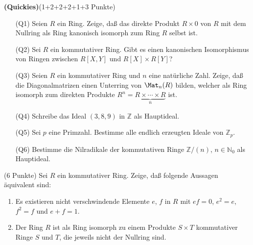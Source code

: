\documentclass{algsheet}
\author{Dipl.-Math.~Franz Vogler}
\date{06.~Juni 2011}
\begin{document}
                \maketitle


\begin{exercise}\textbf{(Quickies)}(1+2+2+2+1+3 Punkte)\vspace{-1ex}
 \begin{itemize}
  \item [(Q1)]     Seien \(R\) ein Ring. Zeige, daß das direkte Produkt \(R \times 0\) von
    \(R\) mit dem Nullring
    als Ring kanonisch isomorph zum Ring \(R\) selbst ist.
    \item [(Q2)]     Sei \(R\) ein kommutativer Ring. Gibt es einen kanonischen Isomorphismus
    von Ringen zwischen \(R[X, Y]\) und \(R[X] \times R[Y]\)?
  \item [(Q3)]     Seien \(R\) ein kommutativer Ring und \(n\) eine natürliche Zahl. Zeige,
    daß die Diagonalmatrizen einen Unterring von \(\Mat_n(R)\) bilden, welcher
    als Ring isomorph zum direkten Produkte \(R^n = \underbrace{R \times \dotsb
    \times R}_n\) ist.
   \item [(Q4)]     Schreibe das Ideal \((3, 8, 9)\) in \(\mathbb Z\) als Hauptideal.
   \item [(Q5)]       Sei \(p\) eine Primzahl.
    Bestimme alle endlich erzeugten Ideale von \(\mathbb Z_p\).
   \item [(Q6)]      Bestimme die Nilradikale der kommutativen Ringe \(\mathbb Z/(n)\), \(n \in \mathbb N_0\)
    als Hauptideal.
 \end{itemize}
\end{exercise}



\begin{exercise} (6 Punkte)\newline
    Sei \(R\) ein kommutativer Ring. Zeige, daß folgende Aussagen äquivalent
    sind:
    \begin{enumerate}
    \item
        Es existieren nicht verschwindende Elemente \(e\), \(f\) in \(R\) mit
        \(e f = 0\), \(e^2 = e\), \(f^2 = f\) und \(e + f = 1\).
    \item
        Der Ring \(R\) ist als Ring isomorph zu einem Produkte \(S \times T\)
        kommutativer Ringe \(S\) und \(T\), die jeweils nicht der Nullring sind.
    \end{enumerate}
\end{exercise}
\end{document}
